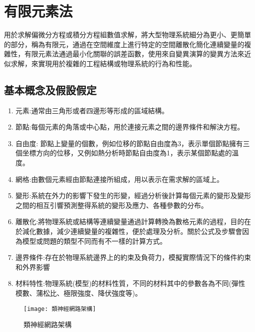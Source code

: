 \chapter{有限元素法}
用於求解偏微分方程或積分方程組數值求解，將大型物理系統細分為更小、更簡單的部分，稱為有限元，通過在空間維度上進行特定的空間離散化簡化連續變量的複雜性，有限元素法通過最小化關聯的誤差函數，使用來自變異演算的變異方法來近似求解，來實現用於複雜的工程結構或物理系統的行為和性能。\\

\section{基本概念及假設假定}
\begin{enumerate}
\item 元素:通常由三角形或者四邊形等形成的區域結構。
\item 節點:每個元素的角落或中心點，用於連接元素之間的邊界條件和解決方程。
\item 自由度: 節點上變量的個數，例如位移的節點自由度為3，表示單個節點擁有三個坐標方向的位移，又例如熱分析時節點自由度為1，表示某個節點處的溫度。
\item 網格:由數個元素經由節點連接所組成，用以表示在需求解的區域上。
\item 變形:系統在外力的影響下發生的形變，經過分析後計算每個元素的變形及變形之間的相互引響預測整得系統的變形及應力、各種參數的分布。
\item 離散化:將物理系統或結構等連續變量通過計算轉換為數格元素的過程，目的在於減化數據，減少連續變量的複雜性，便於處理及分析。關於公式及步驟會因為模型或問題的類型不同而有不一樣的計算方式。
\item 邊界條件:存在於物理系統邊界上的約束及負荷力，模擬實際情況下的條件約束和外界影響
\item 材料特性:物理系統(模型)的材料性質，不同的材料其中的參數各為不同(彈性模數、蒲松比、極限強度、降伏強度等)。
\end{enumerate}

\begin{figure}[hbt!]
\begin{center}
\texttt{[image: 類神經網路架構]}
\caption{\Large 類神經網路架構}\label{類神經網路架構}
\end{center}
\end{figure}
\newpage

